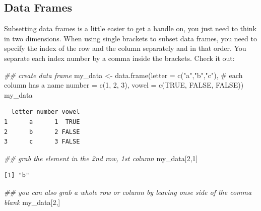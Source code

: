 \documentclass[
  letterpaper,
  DIV=11,
  numbers=noendperiod]{scrreprt}
\newenvironment{Shaded}{\begin{snugshade}}{\end{snugshade}}
\newcommand{\AttributeTok}[1]{\textcolor[rgb]{0.40,0.45,0.13}{#1}}
\newcommand{\CommentTok}[1]{\textcolor[rgb]{0.37,0.37,0.37}{#1}}
\newcommand{\ConstantTok}[1]{\textcolor[rgb]{0.56,0.35,0.01}{#1}}
\newcommand{\DecValTok}[1]{\textcolor[rgb]{0.68,0.00,0.00}{#1}}
\newcommand{\DocumentationTok}[1]{\textcolor[rgb]{0.37,0.37,0.37}{\textit{#1}}}
\newcommand{\FunctionTok}[1]{\textcolor[rgb]{0.28,0.35,0.67}{#1}}
\newcommand{\NormalTok}[1]{\textcolor[rgb]{0.00,0.23,0.31}{#1}}
\newcommand{\OtherTok}[1]{\textcolor[rgb]{0.00,0.23,0.31}{#1}}
\newcommand{\StringTok}[1]{\textcolor[rgb]{0.13,0.47,0.30}{#1}}
\begin{document}
\subsection{Data Frames}\label{sec-sub_data}

Subsetting data frames is a little easier to get a handle on, you just
need to think in two dimensions. When using single brackets to subset
data frames, you need to specify the index of the row and the column
separately and in that order. You separate each index number by a comma
inside the brackets. Check it out:

\begin{Shaded}
\begin{Highlighting}[]
\DocumentationTok{\#\# create data frame}
\NormalTok{my\_data }\OtherTok{\textless{}{-}} \FunctionTok{data.frame}\NormalTok{(}\AttributeTok{letter =} \FunctionTok{c}\NormalTok{(}\StringTok{"a"}\NormalTok{,}\StringTok{"b"}\NormalTok{,}\StringTok{"c"}\NormalTok{), }\CommentTok{\# each column has a name}
                      \AttributeTok{number =} \FunctionTok{c}\NormalTok{(}\DecValTok{1}\NormalTok{, }\DecValTok{2}\NormalTok{, }\DecValTok{3}\NormalTok{),}
                      \AttributeTok{vowel =} \FunctionTok{c}\NormalTok{(}\ConstantTok{TRUE}\NormalTok{, }\ConstantTok{FALSE}\NormalTok{, }\ConstantTok{FALSE}\NormalTok{))}
\NormalTok{my\_data}
\end{Highlighting}
\end{Shaded}

\begin{verbatim}
  letter number vowel
1      a      1  TRUE
2      b      2 FALSE
3      c      3 FALSE
\end{verbatim}

\begin{Shaded}
\begin{Highlighting}[]
\DocumentationTok{\#\# grab the element in the 2nd row, 1st column}
\NormalTok{my\_data[}\DecValTok{2}\NormalTok{,}\DecValTok{1}\NormalTok{]}
\end{Highlighting}
\end{Shaded}

\begin{verbatim}
[1] "b"
\end{verbatim}

\begin{Shaded}
\begin{Highlighting}[]
\DocumentationTok{\#\# you can also grab a whole row or column by leaving onse side of the comma blank}
\NormalTok{my\_data[}\DecValTok{2}\NormalTok{,]}
\end{Highlighting}
\end{Shaded}
\end{document}

